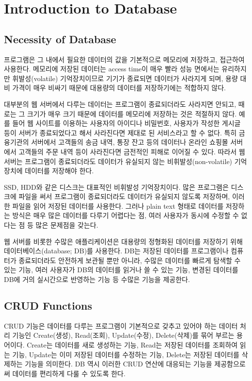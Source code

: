 \section{Introduction to Database}\label{sect:db-intro}

\subsection*{Necessity of Database}

프로그램은 그 내에서 필요한 데이터의 값을 기본적으로 메모리에 저장하고, 접근하여 사용한다. 메모리에 저장된 데이터는 access time이 매우 빨라 성능 면에서는 유리하지만 휘발성(volatile) 기억장치이므로 기기가 종료되면 데이터가 사라지게 되며, 용량 대비 가격이 매우 비싸기 때문에 대용량의 데이터를 저장하기에는 적합하지 않다.

대부분의 웹 서버에서 다루는 데이터는 프로그램이 종료되더라도 사라지면 안되고, 때로는 그 크기가 매우 크기 때문에 데이터를 메모리에 저장하는 것은 적절하지 않다. 예를 들어 웹 사이트를 이용하는 사용자의 아이디나 비밀번호, 사용자가 작성한 게시글 등이 서버가 종료되었다고 해서 사라진다면 제대로 된 서비스라고 할 수 없다. 특히 금융기관의 서버에서 고객들의 송금 내역, 통장 잔고 등의 데이터나 온라인 쇼핑몰 서버에서 고객들의 주문 내역 등이 사라진다면 금전적인 피해로 이어질 수 있다. 따라서 웹 서버는 프로그램이 종료되더라도 데이터가 유실되지 않는 비휘발성(non-volatile) 기억장치에 데이터를 저장해야 한다.

SSD, HDD와 같은 디스크는 대표적인 비휘발성 기억장치이다. 많은 프로그램은 디스크에 파일을 써서 프로그램이 종료되더라도 데이터가 유실되지 않도록 저장하며, 이러한 파일을 읽어 저장된 데이터를 사용한다. 그러나 plain text 형태로 데이터를 저장하는 방식은 매우 많은 데이터를 다루기 어렵다는 점, 여러 사용자가 동시에 수정할 수 없다는 점 등 많은 문제점을 갖는다.

웹 서버를 비롯한 수많은 애플리케이션은 대용량의 정형화된 데이터를 저장하기 위해 데이터베이스(database; DB)를 사용한다. DB는 저장된 데이터를 프로그램이나 컴퓨터가 종료되더라도 안전하게 보관될 뿐만 아니라, 수많은 데이터를 빠르게 탐색할 수 있는 기능, 여러 사용자가 DB의 데이터를 읽거나 쓸 수 있는 기능, 변경된 데이터를 DB에 거의 실시간으로 반영하는 기능 등 수많은 기능을 제공한다.

\subsection*{CRUD Functions}

CRUD 기능은 데이터를 다루는 프로그램이 기본적으로 갖추고 있어야 하는 데이터 처리 기능인 Create(생성), Read(조회), Update(수정), Delete(삭제)를 묶어 부르는 용어이다. Create는 데이터를 새로 생성하는 기능, Read는 저장된 데이터를 조회하여 읽는 기능, Update는 이미 저장된 데이터를 수정하는 기능, Delete는 저장된 데이터를 삭제하는 기능을 의미한다. DB 역시 이러한 CRUD 연산에 대응되는 기능을 제공함으로써 데이터를 편리하게 다룰 수 있도록 한다.

